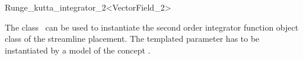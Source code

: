 

\begin{ccRefFunctionObjectClass}{Runge_kutta_integrator_2<VectorField_2>}  %

\ccDefinition
  
The class \ccRefName\ can be used to instantiate the second order integrator
function object class of the streamline placement.
The templated parameter  has to
be instantiated by a model of the concept .



\ccIsModel 

 \\


\ccSeeAlso
{} \\
\end{ccRefFunctionObjectClass}


